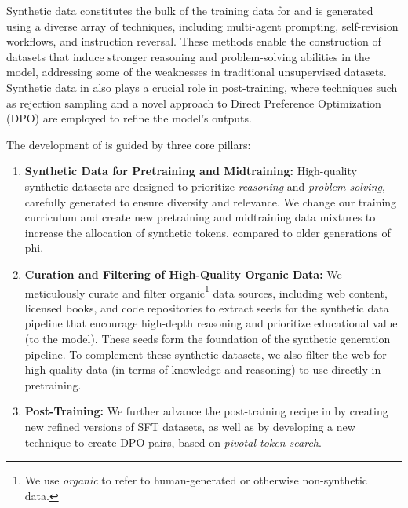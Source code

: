 Synthetic data constitutes the bulk of the training data for \model and is generated using a diverse array of techniques, including multi-agent prompting, self-revision workflows, and instruction reversal. These methods enable the construction of  datasets that induce stronger reasoning and problem-solving abilities in the model, addressing some of the weaknesses in traditional unsupervised datasets. Synthetic data in \model also plays a crucial role in post-training, where techniques such as rejection sampling and a novel approach to Direct Preference Optimization (DPO) are employed to refine the model’s outputs.

The development of \model is guided by three core pillars: \begin{enumerate} 
\item 
\textbf{Synthetic Data for Pretraining and Midtraining:} High-quality synthetic datasets are designed to prioritize \emph{reasoning} and \emph{problem-solving}, carefully generated to ensure diversity and relevance. We change our training curriculum and create new pretraining and midtraining data mixtures to increase the allocation of synthetic tokens, compared to older generations of \textsf{phi}.


\item 
\textbf{Curation and Filtering of High-Quality Organic Data:} We meticulously curate and filter organic\footnote{We use \textit{organic} to refer to human-generated or otherwise non-synthetic data.} data sources, including web content, licensed books, and code repositories to extract seeds for the synthetic data pipeline that encourage high-depth reasoning and prioritize educational value (to the model). These seeds form the foundation of the synthetic generation pipeline. 
To complement these synthetic datasets, we also filter the web for high-quality data (in terms of knowledge and reasoning) to use directly in pretraining.

\item \textbf{Post-Training:} We further advance the post-training recipe in \model by creating new refined versions of SFT datasets, as well as by developing a new technique to create DPO pairs, based on \emph{pivotal token search}.

\end{enumerate}

